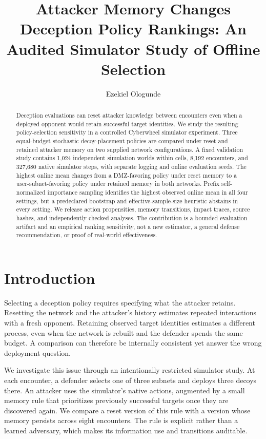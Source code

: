 \documentclass[sigconf,nonacm]{acmart}
\title{Attacker Memory Changes Deception Policy Rankings: An Audited Simulator Study of Offline Selection}
\author{Ezekiel Ologunde}
\affiliation{\institution{Independent Researcher}\city{Boston}\state{MA}\country{USA}}
\begin{document}
\begin{abstract}
Deception evaluations can reset attacker knowledge between encounters even when a deployed opponent would retain successful target identities. We study the resulting policy-selection sensitivity in a controlled Cyberwheel simulator experiment. Three equal-budget stochastic decoy-placement policies are compared under reset and retained attacker memory on two supplied network configurations. A fixed validation study contains 1,024 independent simulation worlds within cells, 8,192 encounters, and 327,680 native simulator steps, with separate logging and online evaluation seeds. The highest online mean changes from a DMZ-favoring policy under reset memory to a user-subnet-favoring policy under retained memory in both networks. Prefix self-normalized importance sampling identifies the highest observed online mean in all four settings, but a predeclared bootstrap and effective-sample-size heuristic abstains in every setting. We release action propensities, memory transitions, impact traces, source hashes, and independently checked analyses. The contribution is a bounded evaluation artifact and an empirical ranking sensitivity, not a new estimator, a general defense recommendation, or proof of real-world effectiveness.
\end{abstract}
\maketitle

\section{Introduction}
Selecting a deception policy requires specifying what the attacker retains. Resetting the network and the attacker's history estimates repeated interactions with a fresh opponent. Retaining observed target identities estimates a different process, even when the network is rebuilt and the defender spends the same budget. A comparison can therefore be internally consistent yet answer the wrong deployment question.

We investigate this issue through an intentionally restricted simulator study. At each encounter, a defender selects one of three subnets and deploys three decoys there. An attacker uses the simulator's native actions, augmented by a small memory rule that prioritizes previously successful targets once they are discovered again. We compare a reset version of this rule with a version whose memory persists across eight encounters. The rule is explicit rather than a learned adversary, which makes its information use and transitions auditable.
\end{document}

